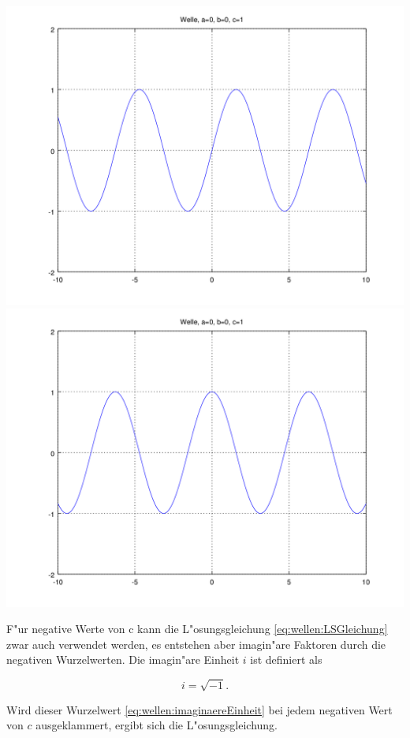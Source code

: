 \noindent
\includegraphics[scale=0.35]{./wellen/images/basicfunctions/sin.png}
\includegraphics[scale=0.35]{./wellen/images/basicfunctions/cos.png}

F"ur negative Werte von c kann die L"osungsgleichung 
\ref{eq:wellen:LSGleichung} zwar auch verwendet werden, es entstehen aber 
imagin"are Faktoren durch die negativen Wurzelwerten. Die imagin"are Einheit 
$i$ ist definiert als

\begin{equation}
	i = \sqrt{-1}.
	\label{eq:wellen:imaginaereEinheit}
\end{equation}

Wird dieser Wurzelwert \ref{eq:wellen:imaginaereEinheit} bei jedem negativen 
Wert 
von $c$ ausgeklammert, ergibt sich die L"osungsgleichung.

